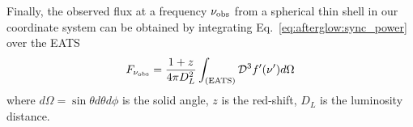 Finally, the observed flux at a frequency $\nu_{\rm obs}$ from a spherical thin shell
in our coordinate system can be obtained by integrating 
Eq.~\eqref{eq:afterglow:sync_power} over the \ac{EATS} 
\begin{equation}
    F_{\nu_{\rm obs}} = \frac{1+z}{4\pi D_L^2} \int_{\rm (EATS)} \mathcal{D}^3 f'(\nu') d\Omega
    \label{eq:afterglow:sync_power_obs}
\end{equation}
where $d\Omega = \sin\theta d\theta d\phi$ is the solid angle, $z$ is the red-shift, 
$D_L$ is the luminosity distance. 



\section{\pyblast{}}\label{sec:afterglow:code}

\def\eq{\text{equation}}
\def\eqs{\text{equations}}


